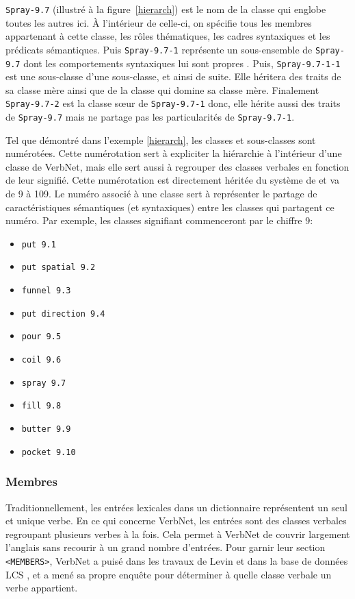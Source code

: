 \texttt{Spray-9.7} (illustré à la figure~\ref{hierarch}) est le nom de la classe qui englobe toutes les autres ici. À l'intérieur de celle-ci, on spécifie tous les membres appartenant à cette classe, les rôles thématiques, les cadres syntaxiques et les prédicats sémantiques. Puis \texttt{Spray-9.7-1} représente un sous-ensemble de \texttt{Spray-9.7} dont les comportements syntaxiques lui sont propres .  Puis, \texttt{Spray-9.7-1-1} est une sous-classe d'une sous-classe, et ainsi de suite. Elle héritera des traits de sa classe mère ainsi que de la classe qui domine sa classe mère. Finalement \texttt{Spray-9.7-2} est la classe sœur de \texttt{Spray-9.7-1} donc, elle hérite aussi des traits de \texttt{Spray-9.7} mais ne partage pas les particularités de \texttt{Spray-9.7-1}.

Tel que démontré dans l'exemple \ref{hierarch}, les classes et sous-classes sont numérotées. Cette numérotation sert à expliciter la hiérarchie à l'intérieur d'une classe de VerbNet, mais elle sert aussi à regrouper des classes verbales en fonction de leur signifié. Cette numérotation est directement héritée du système de \cite{verb-classes.levin.1993} et va de 9 à 109. Le numéro associé à une classe sert à représenter le partage de caractéristiques sémantiques (et syntaxiques) entre les classes qui partagent ce numéro. Par exemple, les classes signifiant  commenceront par le chiffre 9:

\begin{itemize}
  \item \texttt{put 9.1}
	\item \texttt{put spatial 9.2}
	\item \texttt{funnel 9.3}
	\item \texttt{put direction 9.4}
	\item \texttt{pour 9.5}
	\item \texttt{coil 9.6}
	\item \texttt{spray 9.7}
	\item \texttt{fill 9.8}
	\item \texttt{butter 9.9}
	\item \texttt{pocket 9.10}
\end{itemize}

\subsubsection{Membres}
Traditionnellement, les entrées lexicales dans un dictionnaire représentent un seul et unique verbe. En ce qui concerne VerbNet, les entrées sont des classes verbales regroupant  plusieurs verbes à la fois. Cela permet à VerbNet de couvrir largement l'anglais sans recourir à un grand nombre d'entrées. Pour garnir leur section \texttt{<MEMBERS>}, VerbNet a puisé dans les travaux de Levin \cite{verb-classes.levin.1993} et dans la base de données LCS \citep{AyanGeneratingParsingLexicon2002a}, et a mené sa propre enquête pour déterminer à quelle classe verbale un verbe appartient.

